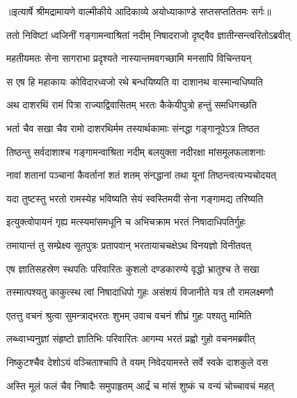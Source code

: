 {॥इत्यार्षे श्रीमद्रामायणे वाल्मीकीये आदिकाव्ये अयोध्याकाण्डे सप्तसप्ततितमः सर्गः॥}


\twolineshloka
{ततो निविष्टां ध्वजिनीं गङ्गामन्वाश्रितां नदीम्}
{निषादराजो दृष्ट्वैव ज्ञातीन्सन्त्वरितोऽब्रवीत्} %

\twolineshloka
{महतीयमतः सेना सागराभा प्रदृश्यते}
{नास्यान्तमवगच्छामि मनसापि विचिन्तयन्} %

\twolineshloka
{स एष हि महाकायः कोविदारध्वजो रथे}
{बन्धयिष्यति वा दाशानथ वास्मान्वधिष्यति} %

\twolineshloka
{अथ दाशरथिं रामं पित्रा राज्याद्विवासितम्}
{भरतः कैकेयीपुत्रो हन्तुं समधिगच्छति} %

\twolineshloka
{भर्ता चैव सखा चैव रामो दाशरथिर्मम}
{तस्यार्थकामाः संनद्धा गङ्गानूपेऽत्र तिष्ठत} %

\twolineshloka
{तिष्ठन्तु सर्वदाशाश्च गङ्गामन्वाश्रिता नदीम्}
{बलयुक्ता नदीरक्षा मांसमूलफलाशनाः} %

\twolineshloka
{नावां शतानां पञ्चानां कैवर्तानां शतं शतम्}
{संनद्धानां तथा यूनां तिष्ठन्त्वत्यभ्यचोदयत्} %

\twolineshloka
{यदा तुष्टस्तु भरतो रामस्येह भविष्यति}
{सेयं स्वस्तिमयी सेना गङ्गामद्य तरिष्यति} %

\twolineshloka
{इत्युक्त्वोपायनं गृह्य मत्स्यमांसमधूनि च}
{अभिचक्राम भरतं निषादाधिपतिर्गुहः} %

\twolineshloka
{तमायान्तं तु सम्प्रेक्ष्य सूतपुत्रः प्रतापवान्}
{भरतायाचचक्षेऽथ विनयज्ञो विनीतवत्} %

\twolineshloka
{एष ज्ञातिसहस्रेण स्थपतिः परिवारितः}
{कुशलो दण्डकारण्ये वृद्धो भ्रातुश्च ते सखा} %

\twolineshloka
{तस्मात्पश्यतु काकुत्स्थ त्वां निषादाधिपो गुहः}
{असंशयं विजानीते यत्र तौ रामलक्ष्मणौ} %

\twolineshloka
{एतत्तु वचनं श्रुत्वा सुमन्त्राद्भरतः शुभम्}
{उवाच वचनं शीघ्रं गुहः पश्यतु मामिति} %

\twolineshloka
{लब्ध्वाभ्यनुज्ञां संहृष्टो ज्ञातिभिः परिवारितः}
{आगम्य भरतं प्रह्वो गुहो वचनमब्रवीत्} %

\twolineshloka
{निष्कुटश्चैव देशोऽयं वञ्चिताश्चापि ते वयम्}
{निवेदयामस्ते सर्वे स्वके दाशकुले वस} %

\twolineshloka
{अस्ति मूलं फलं चैव निषादैः समुपाहृतम्}
{आर्द्रं च मांसं शुष्कं च वन्यं चोच्चावचं महत्} %

